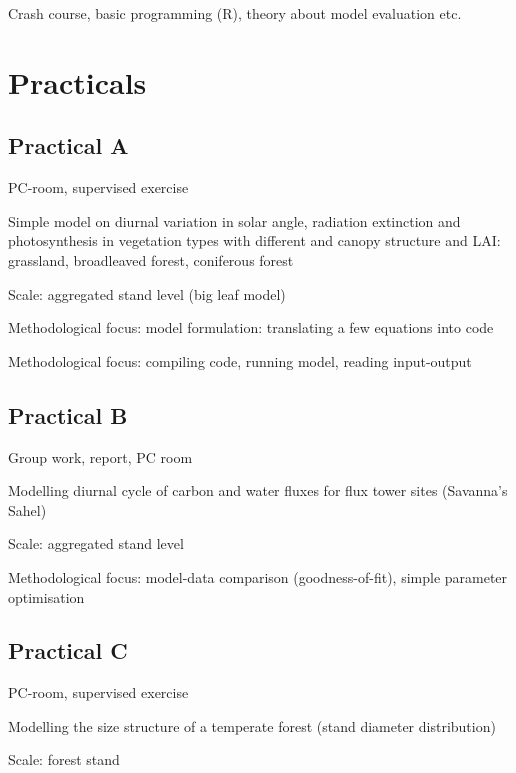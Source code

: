 \documentclass[
  12pt,
  oneside]{book}
\begin{document}
Crash course, basic programming (R), theory about model evaluation etc.

\hypertarget{part-practicals}{%
\part{Practicals}\label{part-practicals}}

\hypertarget{practical-a}{%
\chapter*{Practical A}\label{practical-a}}

PC-room, supervised exercise

Simple model on diurnal variation in solar angle, radiation extinction and photosynthesis in vegetation types with different and canopy structure and LAI: grassland, broadleaved forest, coniferous forest

Scale: aggregated stand level (big leaf model)

Methodological focus: model formulation: translating a few equations into code

Methodological focus: compiling code, running model, reading input-output

\hypertarget{practical-b}{%
\chapter*{Practical B}\label{practical-b}}

Group work, report, PC room

Modelling diurnal cycle of carbon and water fluxes for flux tower sites (Savanna's Sahel)

Scale: aggregated stand level

Methodological focus: model-data comparison (goodness-of-fit), simple parameter optimisation

\hypertarget{practical-c}{%
\chapter*{Practical C}\label{practical-c}}

PC-room, supervised exercise

Modelling the size structure of a temperate forest (stand diameter distribution)

Scale: forest stand
\end{document}
